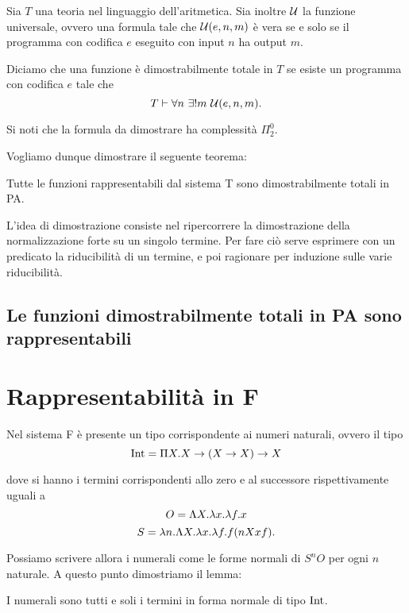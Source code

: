 \documentclass[]{marticle}
\begin{document}
Sia $T$ una teoria nel linguaggio dell'aritmetica. Sia inoltre $\mathcal{U}$ la funzione
universale, ovvero una formula  tale che $\mathcal{U} (e, n, m)$ \`e
vera se e solo se il programma con codifica $e$ eseguito con input $n$ ha output
$m$. 

Diciamo che una funzione \`e dimostrabilmente totale in $T$ se esiste un
programma con codifica $e$ tale che
\[
    T \vdash \forall n\ \exists ! m\ \uni(e, n, m).
\]

Si noti che la formula da dimostrare ha complessit\`a $\Pi^0_2$.

Vogliamo dunque dimostrare il seguente teorema:
\begin{block}[Teorema]
    Tutte le funzioni rappresentabili dal sistema T sono dimostrabilmente totali
    in PA.
\end{block}

L'idea di dimostrazione consiste nel ripercorrere la dimostrazione della
normalizzazione forte su un singolo termine. Per fare ci\`o serve esprimere con
un predicato la riducibilit\`a di un termine, e poi ragionare per induzione
sulle varie riducibilit\`a.

\subsection{Le funzioni dimostrabilmente totali in PA sono rappresentabili}


\section{Rappresentabilit\`a in F}

Nel sistema F \`e presente un tipo corrispondente ai numeri naturali, ovvero il
tipo
\[
    \text{Int} = \Pi X. X \rightarrow (X \rightarrow X) \rightarrow X
\]

dove si hanno i termini corrispondenti allo zero e al successore rispettivamente
uguali a
\[
    O = \Lambda X. \lambda x. \lambda f. x
\]
\[
    S = \lambda n. \Lambda X. \lambda x. \lambda f. f (nXxf).
\]

Possiamo scrivere allora i numerali come le forme normali di $S^nO$ per ogni $n$
naturale. A questo punto dimostriamo il lemma:

\begin{block}[Lemma]
    I numerali sono tutti e soli i termini in forma normale di tipo $\text{Int}$. 
\end{block}

\end{document}

